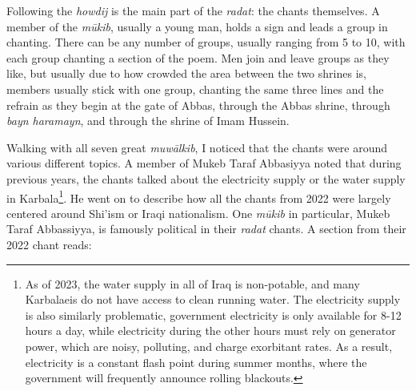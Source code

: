 


Following the \emph{howdij} is the main part of the \emph{radat}: the chants themselves. A member of the \emph{mūkib}, usually a young man, holds a sign and leads a group in chanting. There can be any number of groups, usually ranging from 5 to 10, with each group chanting a section of the poem. Men join and leave groups as they like, but usually due to how crowded the area between the two shrines is, members usually stick with one group, chanting the same three lines and the refrain as they begin at the gate of Abbas, through the Abbas shrine, through \emph{bayn haramayn}, and through the shrine of Imam Hussein. 

Walking with all seven great \emph{muwālkib}, I noticed that the chants were around various different topics. A member of Mukeb Taraf Abbasiyya noted that during previous years, the chants talked about the electricity supply or the water supply in Karbala\footnote{As of 2023, the water supply in all of Iraq is non-potable, and many Karbalaeis do not have access to clean running water. The electricity supply is also similarly problematic, government electricity is only available for 8-12 hours a day, while electricity during the other hours must rely on generator power, which are noisy, polluting, and charge exorbitant rates. As a result, electricity is a constant flash point during summer months, where the government will frequently announce rolling blackouts.}. He went on to describe how all the chants from 2022 were largely centered around Shi'ism or Iraqi nationalism. One \emph{mūkib} in particular, Mukeb Taraf Abbassiyya, is famously political in their \emph{radat} chants. A section from their 2022 chant reads: 



